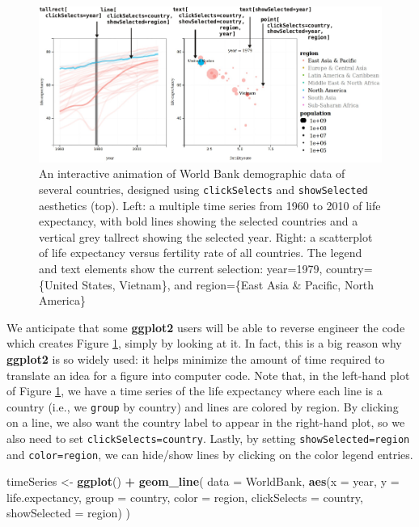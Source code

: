 \documentclass[12pt,]{article}
\newenvironment{Shaded}{\begin{snugshade}}{\end{snugshade}}
\newcommand{\DataTypeTok}[1]{\textcolor[rgb]{0.13,0.29,0.53}{#1}}
\newcommand{\KeywordTok}[1]{\textcolor[rgb]{0.13,0.29,0.53}{\textbf{#1}}}
\newcommand{\NormalTok}[1]{#1}
\newcommand{\OperatorTok}[1]{\textcolor[rgb]{0.81,0.36,0.00}{\textbf{#1}}}
\newcommand{\StringTok}[1]{\textcolor[rgb]{0.31,0.60,0.02}{#1}}
\theoremstyle{definition}
\theoremstyle{definition}
\theoremstyle{definition}
\theoremstyle{remark}
\begin{document}
\begin{figure}
\centering
\includegraphics{images/figure-1}
\caption{\label{fig:worldbank}An interactive animation of World Bank
demographic data of several countries, designed using
\texttt{clickSelects} and \texttt{showSelected} aesthetics (top). Left:
a multiple time series from 1960 to 2010 of life expectancy, with bold
lines showing the selected countries and a vertical grey tallrect
showing the selected year. Right: a scatterplot of life expectancy
versus fertility rate of all countries. The legend and text elements
show the current selection: year=1979, country=\{United States,
Vietnam\}, and region=\{East Asia \& Pacific, North America\}}
\end{figure}

We anticipate that some \textbf{ggplot2} users will be able to reverse
engineer the code which creates Figure \ref{fig:worldbank}, simply by
looking at it. In fact, this is a big reason why \textbf{ggplot2} is so
widely used: it helps minimize the amount of time required to translate
an idea for a figure into computer code. Note that, in the left-hand
plot of Figure \ref{fig:worldbank}, we have a time series of the life
expectancy where each line is a country (i.e., we \texttt{group} by
country) and lines are colored by region. By clicking on a line, we also
want the country label to appear in the right-hand plot, so we also need
to set \texttt{clickSelects=country}. Lastly, by setting
\texttt{showSelected=region} and \texttt{color=region}, we can hide/show
lines by clicking on the color legend entries.

\begin{Shaded}
\begin{Highlighting}[]
\NormalTok{timeSeries <-}\StringTok{ }\KeywordTok{ggplot}\NormalTok{() }\OperatorTok{+}\StringTok{ }\KeywordTok{geom_line}\NormalTok{(}
  \DataTypeTok{data =}\NormalTok{ WorldBank,}
  \KeywordTok{aes}\NormalTok{(}\DataTypeTok{x =}\NormalTok{ year, }\DataTypeTok{y =}\NormalTok{ life.expectancy,}
      \DataTypeTok{group =}\NormalTok{ country, }\DataTypeTok{color =}\NormalTok{ region,}
      \DataTypeTok{clickSelects =}\NormalTok{ country, }
      \DataTypeTok{showSelected =}\NormalTok{ region)}
\NormalTok{)}
\end{Highlighting}
\end{Shaded}
\end{document}
